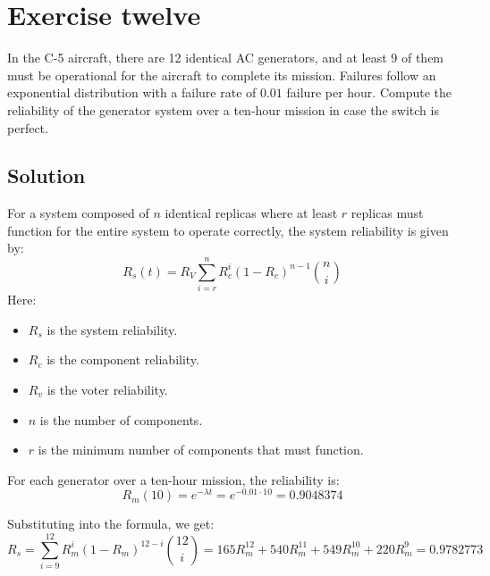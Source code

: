 \section{Exercise twelve}

In the C-5 aircraft, there are 12 identical AC generators, and at least 9 of them must be operational for the aircraft to complete its mission. 
Failures follow an exponential distribution with a failure rate of $0.01$ failure per hour.
Compute the reliability of the generator system over a ten-hour mission in case the switch is perfect.

\subsection*{Solution}
For a system composed of $n$ identical replicas where at least $r$ replicas must function for the entire system to operate correctly, the system reliability is given by:
\[R_s(t)=R_V\sum_{i=r}^{n}R_c^i(1-R_c)^{n-1}\binom{n}{i} \]
Here: 
\begin{itemize}
    \item $R_s$ is the system reliability. 
    \item $R_c$ is the component reliability. 
    \item $R_v$ is the voter reliability. 
    \item $n$ is the number of components. 
    \item $r$ is the minimum number of components that must function.
\end{itemize}

For each generator over a ten-hour mission, the reliability is:
\[R_m(10)=e^{-\lambda t}=e^{-0.01\cdot 10}=0.9048374\]

Substituting into the formula, we get:
\[R_s=\sum_{i=9}^12R_m^i\left(1-R_m\right)^{12-i}\binom{12}{i}=165R_m^{12}+540 R_m^{11}+549R_m^10 +220 R_m^9 =0.9782773\]